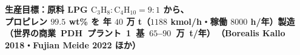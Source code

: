\begin{frame}[t]
  \vspace{0.4em}

  {\setlength{\fboxsep}{5pt}%
   \noindent\colorbox{HiBlue}{%
    \begin{minipage}{\dimexpr\linewidth-2\fboxsep\relax}
     \footnotesize\bfseries\color{HeaderBlue}%
     生産目標：原料 LPG \mbox{$\mathrm{C_3H_8}{:}\mathrm{C_4H_{10}}{=}9{:}1$} から、\\
     {\color{SpRed}プロピレン $99.5$ wt\%} を
     {\color{SpRed}年 $40$ 万 t（$1188$ kmol/h・稼働 $8000$ h/年）}製造
     {\scriptsize\mdseries\mbox{（世界の商業 PDH プラント 1 基 $65$–$90$ 万 t/年）}{\tiny\,（Borealis Kallo 2018・Fujian Meide 2022 ほか）}}
    \end{minipage}}}

\end{frame}
